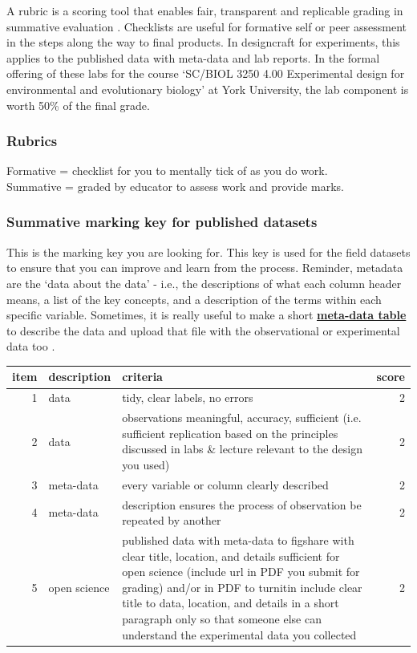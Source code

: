 \documentclass[
]{book}
\begin{document}
A rubric is a scoring tool that enables fair, transparent and replicable grading in summative evaluation \citep{RN6799}. Checklists are useful for formative self or peer assessment in the steps along the way to final products. In designcraft for experiments, this applies to the published data with meta-data and lab reports. In the formal offering of these labs for the course `SC/BIOL 3250 4.00 Experimental design for environmental and evolutionary biology' at York University, the lab component is worth 50\% of the final grade.

\hypertarget{rubrics-1}{%
\subsubsection*{Rubrics}\label{rubrics-1}}

Formative = checklist for you to mentally tick of as you do work.\\
Summative = graded by educator to assess work and provide marks.

\hypertarget{summative-marking-key-for-published-datasets}{%
\subsubsection*{Summative marking key for published datasets}\label{summative-marking-key-for-published-datasets}}

This is the marking key you are looking for. This key is used for the field datasets to ensure that you can improve and learn from the process. Reminder, metadata are the `data about the data' - i.e., the descriptions of what each column header means, a list of the key concepts, and a description of the terms within each specific variable. Sometimes, it is really useful to make a short \href{https://onlinelibrary.wiley.com/doi/full/10.1002/ece3.9245}{\textbf{meta-data table}} to describe the data and upload that file with the observational or experimental data too \citep{RNtables}.

\begin{tabular}{rllr}
\toprule
item & description & criteria & score\\
\midrule
1 & data & tidy, clear labels, no errors & 2\\
2 & data & observations meaningful, accuracy, sufficient (i.e. sufficient replication based on the principles discussed in labs \& lecture relevant to the design you used) & 2\\
3 & meta-data & every variable or column clearly described & 2\\
4 & meta-data & description ensures the process of observation be repeated by another & 2\\
5 & open science & published data with meta-data to figshare with clear title, location, and details sufficient for open science (include url in PDF you submit for grading) and/or in PDF to turnitin include clear title to data, location, and details in a short paragraph only so that someone else can understand the experimental data you collected & 2\\
\bottomrule
\end{tabular}
\end{document}
